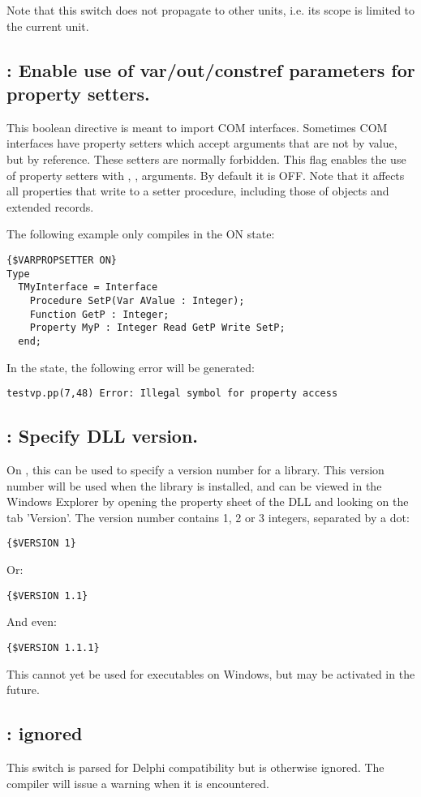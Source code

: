 Note that this switch does not propagate to other units, i.e. its scope
is limited to the current unit.

\subsection{ : Enable use of var/out/constref
parameters for property setters.}
This boolean directive is meant to import COM interfaces. Sometimes COM
interfaces have property setters which accept arguments that are not by
value, but by reference. These setters are normally forbidden. This flag
enables the use of property setters with , , 
arguments. By default it is OFF. Note that it affects all properties that 
write to a setter procedure, including those of objects and extended records.

The following example only compiles in the ON state:
\begin{verbatim}
{$VARPROPSETTER ON}
Type
  TMyInterface = Interface
    Procedure SetP(Var AValue : Integer);
    Function GetP : Integer;
    Property MyP : Integer Read GetP Write SetP;
  end;
\end{verbatim}
In the  state, the following error will be generated:
\begin{verbatim}
testvp.pp(7,48) Error: Illegal symbol for property access
\end{verbatim}

\subsection{ : Specify DLL version.}
On \windows, this can be used to specify a version number for a library.
This version number will be used when the library is installed, and can be
viewed in the Windows Explorer by opening the property sheet of the DLL and
looking on the tab 'Version'. 
The version number contains 1, 2 or 3 integers, separated by a dot:
\begin{verbatim}
{$VERSION 1}
\end{verbatim}
Or:
\begin{verbatim}
{$VERSION 1.1}
\end{verbatim}
And even:
\begin{verbatim}
{$VERSION 1.1.1}
\end{verbatim}
This cannot yet be used for executables on Windows, but may be activated in
the future.

\subsection{ : ignored}
This switch is parsed for Delphi compatibility but is otherwise ignored. 
The compiler will issue a warning when it is encountered.

